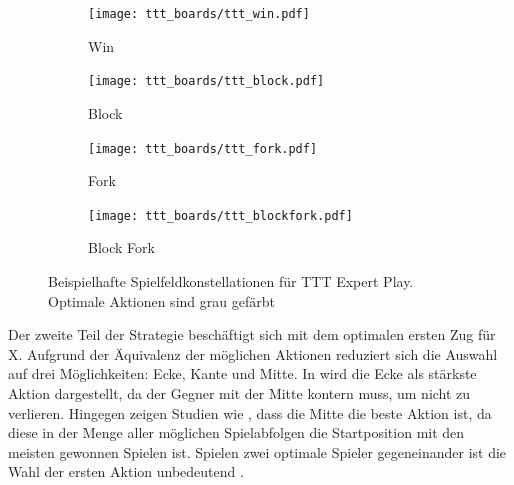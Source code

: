 \begin{figure}
    \centering
    \begin{subfigure}[b]{0.45\textwidth}
      \centering
      \texttt{[image: ttt\_boards/ttt\_win.pdf]}
      \caption{Win}
      \label{fig:ttt_win}
    \end{subfigure}
    \begin{subfigure}[b]{0.45\textwidth}
      \centering
      \texttt{[image: ttt\_boards/ttt\_block.pdf]}
      \caption{Block}
      \label{fig:ttt_block}
    \end{subfigure}
    \begin{subfigure}[b]{0.45\textwidth}
      \centering
      \texttt{[image: ttt\_boards/ttt\_fork.pdf]}
      \caption{Fork}
      \label{fig:ttt_fork}
    \end{subfigure}
    \begin{subfigure}[b]{0.45\textwidth}
      \centering
      \texttt{[image: ttt\_boards/ttt\_blockfork.pdf]}
      \caption{Block Fork}
      \label{fig:ttt_blockfork}
    \end{subfigure}
    \caption[Beispielhafte Spielfeldkonstellationen für TTT Expert Play]{Beispielhafte Spielfeldkonstellationen für \acs{TTT} Expert Play. Optimale Aktionen sind grau gefärbt \protect\footnotemark}
    \label{fig:ttt_expertplay}
\end{figure}


Der zweite Teil der Strategie beschäftigt sich mit dem optimalen ersten Zug für X. 
Aufgrund der Äquivalenz der möglichen Aktionen reduziert sich die Auswahl auf drei Möglichkeiten: Ecke, Kante und Mitte. 
In \cite[S. 38]{gardnerm.HexaflexagonsOtherMathematical1988} wird die Ecke als stärkste Aktion dargestellt, da der Gegner mit der Mitte kontern muss, um nicht zu verlieren. 
Hingegen zeigen Studien wie \cite{kutscheraa.BestOpeningMove2018}, dass die Mitte die beste Aktion ist, da diese in der Menge aller möglichen Spielabfolgen die Startposition mit den meisten gewonnen Spielen ist.
Spielen zwei optimale Spieler gegeneinander ist die Wahl der ersten Aktion unbedeutend \cite[S. 38]{gardnerm.HexaflexagonsOtherMathematical1988}.

